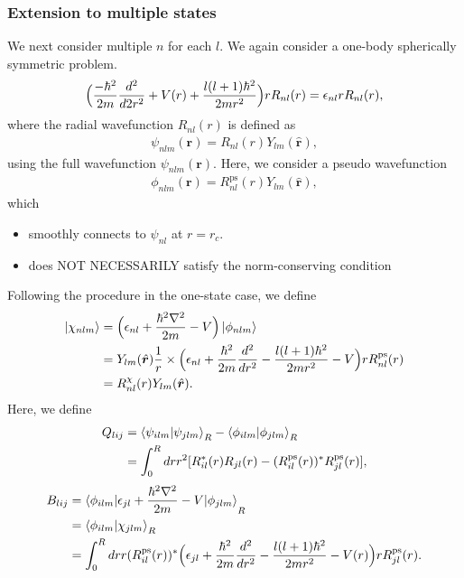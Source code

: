 \documentclass{article}
\begin{document}
\subsubsection{Extension to multiple states}
We next consider multiple $n$ for each $l$.
We again consider a one-body spherically symmetric problem.
\begin{align}
  \Bigl(
    \frac{-\hbar^2}{2m} \frac{d^2}{d2r^2}
    + V(r)
    + \frac{l(l+1)\hbar^2}{2mr^2} 
  \Bigr)r R_{nl}(r)
  = 
  \epsilon_{nl} r R_{nl}(r),
\end{align}
where the radial wavefunction $R_{nl}(r)$ is defined as 
\begin{align}
  \psi_{nlm}(\bm{r}) = R_{nl}(r) Y_{lm}(\hat{\bm{r}}),
\end{align}
using the full wavefunction $\psi_{nlm}(\bm{r})$.
Here, we consider a pseudo wavefunction 
\begin{align}
  \phi_{nlm}(\bm{r}) = R^{\text{ps}}_{nl}(r) Y_{lm}(\hat{\bm{r}}),
\end{align}
which 
\begin{itemize}
  \item smoothly connects to $\psi_{nl}$ at $r = r_c$.
  \item does NOT NECESSARILY satisfy the norm-conserving condition
\end{itemize}
Following the procedure in the one-state case, we define
\begin{align}
  \ket{\chi_{nlm}} 
  &= \Bigl(\epsilon_{nl} + \frac{\hbar^2\nabla^2}{2m} - V \Bigr)\ket{\phi_{nlm}}
  \nonumber
  \\&=
  Y_{lm}(\hat{\bm{r}})
  \frac{1}{r}
  \times
  \Bigl(\epsilon_{nl} + \frac{\hbar^2}{2m} \frac{d^2}{dr^2} - \frac{l(l+1)\hbar^2}{2mr^2} - V \Bigr) r R^{\text{ps}}_{nl}(r)
  \nonumber
  \\&= 
  R^{\chi}_{nl}(r) Y_{lm}(\hat{\bm{r}}).
\end{align}
Here, we define 
\begin{align}
  Q_{lij} 
  &= 
  \braket{\psi_{ilm} | \psi_{jlm}}_R - \braket{\phi_{ilm} | \phi_{jlm}}_R 
  \nonumber
  \\&=
  \int_0^R dr r^2 [ R_{il}^*(r) R_{jl}(r) - (R^{\text{ps}}_{il}(r))^* R^{\text{ps}}_{jl}(r) ],
\end{align}
\begin{align}
  B_{lij} 
  &= 
   \braket{\phi_{ilm} | \epsilon_{jl} + \frac{\hbar^2\nabla^2}{2m} - V|\phi_{jlm}}_R 
  \nonumber
  \\&=
  \braket{\phi_{ilm} | \chi_{jlm}}_R 
  \nonumber
  \\&=
  \int_0^R dr 
  r(R^{\text{ps}}_{il}(r))^* 
  \Bigl(
    \epsilon_{jl} + \frac{\hbar^2}{2m} \frac{d^2}{dr^2} - \frac{l(l+1)\hbar^2}{2mr^2} - V(r)
  \Bigr)
  r R^{\text{ps}}_{jl}(r).
\end{align}
\end{document}

